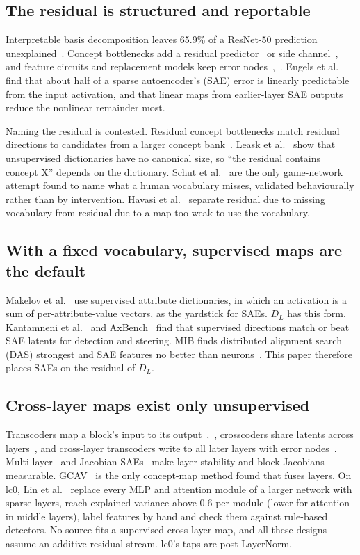 \documentclass[conference]{IEEEtran}
\begin{document}
\subsection{The residual is structured and reportable}\label{sec:4.3}
Interpretable basis decomposition leaves 65.9\% of a ResNet-50 prediction unexplained~\cite{zhou2018}. Concept bottlenecks add a residual predictor~\cite{yuksekgonul2023} or side channel~\cite{havasi2022}, and feature circuits and replacement models keep error nodes~\cite{marks2025},~\cite{ameisen2025}. Engels et al.~\cite{engels2025} find that about half of a sparse autoencoder's (SAE) error is linearly predictable from the input activation, and that linear maps from earlier-layer SAE outputs reduce the nonlinear remainder most.

Naming the residual is contested. Residual concept bottlenecks match residual directions to candidates from a larger concept bank~\cite{shang2024}. Leask et al.~\cite{leask2025} show that unsupervised dictionaries have no canonical size, so ``the residual contains concept X'' depends on the dictionary. Schut et al.~\cite{schut2025} are the only game-network attempt found to name what a human vocabulary misses, validated behaviourally rather than by intervention. Havasi et al.~\cite{havasi2022} separate residual due to missing vocabulary from residual due to a map too weak to use the vocabulary.

\subsection{With a fixed vocabulary, supervised maps are the default}\label{sec:4.4}
Makelov et al.~\cite{makelov2025} use supervised attribute dictionaries, in which an activation is a sum of per-attribute-value vectors, as the yardstick for SAEs. $D_L$ has this form. Kantamneni et al.~\cite{kantamneni2025} and AxBench~\cite{wu2025} find that supervised directions match or beat SAE latents for detection and steering. MIB finds distributed alignment search (DAS) strongest and SAE features no better than neurons~\cite{mueller2025}. This paper therefore places SAEs on the residual of $D_L$.

\subsection{Cross-layer maps exist only unsupervised}\label{sec:4.5}
Transcoders map a block's input to its output~\cite{dunefsky2024},~\cite{paulo2025}, crosscoders share latents across layers~\cite{lindsey2024}, and cross-layer transcoders write to all later layers with error nodes~\cite{ameisen2025}. Multi-layer~\cite{lawson2025} and Jacobian SAEs~\cite{farnik2025} make layer stability and block Jacobians measurable. GCAV~\cite{he2025} is the only concept-map method found that fuses layers. On lc0, Lin et al.~\cite{lin2026} replace every MLP and attention module of a larger network with sparse layers, reach explained variance above 0.6 per module (lower for attention in middle layers), label features by hand and check them against rule-based detectors. No source fits a supervised cross-layer map, and all these designs assume an additive residual stream. lc0's taps are post-LayerNorm.
\end{document}
